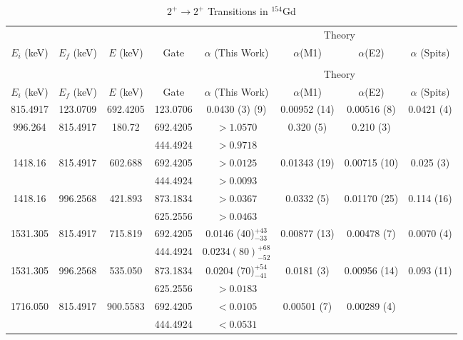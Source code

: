 \begin{sidewaystable}
    \small
    \begin{longtable}{c|c|c|c|c|c|c|c}
        \caption{$2^+\rightarrow 2^+$ Transitions in $^{154}$Gd}
        \label{tab:154Gd_2_to_2}\\
        \toprule
        &	& 	&  &	& \multicolumn{2}{c|}{Theory}	&	\\ 
        $E_i$ (keV)	&	$E_f$ (keV)	& $E$ (keV)	&	Gate &		$\alpha$ (This Work)	& $\alpha$(M1) & $\alpha$(E2) &	$\alpha$ (Spits)	\\
        \hline
        \endfirsthead
        \toprule
        \caption[]{$2^+\rightarrow 2^+$ Transitions in $^{154}$Gd}\\
        &	& 	&  &	& \multicolumn{2}{c|}{Theory}	&	\\ 
        $E_i$ (keV)	&	$E_f$ (keV)	& $E$ (keV)	&	Gate &		$\alpha$ (This Work)	& $\alpha$(M1) & $\alpha$(E2) &	$\alpha$ (Spits)	\\
        \hline
	    \endhead
        815.4917 & 123.0709 &  692.4205 & 123.0706 &  0.0430 (3) (9) & 0.00952 (14) & 0.00516 (8) &  0.0421 (4)\\ \hline
        996.264 & 815.4917 & 180.72 &  692.4205 & $>1.0570$ & 0.320 (5) & 0.210 (3) &  \\
        &  &  & 444.4924 & $>0.9718$ & & &  \\ \hline
        1418.16 & 815.4917 & 602.688 &  692.4205 & $>0.0125$ & 0.01343 (19) & 0.00715 (10) & 0.025 (3)  \\
        &  &  & 444.4924 & $>0.0093$ &  & &\\ \hline
        1418.16 & 996.2568 & 421.893 & 873.1834 & $>0.0367$ & 0.0332 (5) & 0.01170 (25) & 0.114 (16) \\
        &  &  & 625.2556 & $>0.0463$ & & & \\ \hline
        1531.305 & 815.4917 & 715.819 &  692.4205 & 0.0146 (40)$^{+43}_{-33}$ & 0.00877 (13) & 0.00478 (7) & 0.0070 (4)  \\
        &  & & 444.4924 & $0.0234 (80) ^{+68}_{-52}$ & & &\\ \hline
        1531.305 & 996.2568 & 535.050 & 873.1834 & 0.0204 (70)$^{+54}_{-41}$ & 0.0181 (3) & 0.00956 (14) & 0.093 (11)  \\
        & & & 625.2556 & $>0.0183$ & & & \\ \hline
        1716.050 & 815.4917 & 900.5583 &  692.4205 & $<0.0105$ & 0.00501 (7) & 0.00289 (4) &  \\
        & & & 444.4924 & $<0.0531$ & & &  \\ \hline

\end{longtable}
\end{sidewaystable}
